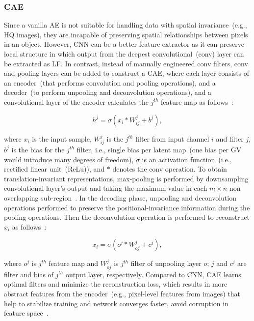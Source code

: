 \subsubsection{CAE}
Since a vanilla AE is not suitable for handling data with spatial invariance~(e.g., HQ images), they are incapable of preserving spatial relationships between pixels in an object. However, CNN can be a better feature extractor as it can preserve local structure in which output from the deepest convolutional~(conv) layer can be extracted as LF. In contrast, instead of manually engineered conv filters, conv and pooling layers can be added to construct a CAE, where each layer consists of an encoder~(that performs convolution and pooling operations), and a decoder~(to perform unpooling and deconvolution operations), and a convolutional layer of the encoder calculates the $j^{th}$ feature map as follows~\cite{alirezaie2019semantic}:

\begin{equation}
    h^{j}=\sigma\left(x_{i} * W_{ij}^{j}+b^{j}\right),
\end{equation}

\hspace*{3.5mm} where $x_i$ is the input sample, $W_{ij}^{j}$ is the $j^{th}$ filter from input channel $i$ and filter $j$, $b^j$ is the bias for the $j^{th}$ filter, i.e., single bias per latent map~(one bias per GV would introduce many degrees of freedom), $\sigma$ is an activation function~(i.e., rectified linear unit~(ReLu)), and $*$ denotes the conv operation. To obtain translation-invariant representations, max-pooling is performed by downsampling convolutional layer's output and taking the maximum value in each $m \times n$ non-overlapping sub-region~\cite{alirezaie2019semantic}. In the decoding phase, unpooling and deconvolution operations performed to preserve the positional-invariance information during the pooling operations. Then the deconvolution operation is performed to reconstruct $x_i$ as follows~\cite{alirezaie2019semantic}:

\begin{equation}
   x_i = \sigma\left(o^{j} * W_{oj}^{j}+c^{j}\right),
\end{equation}

\hspace*{3.5mm} where $o^j$ is $j^{th}$ feature map and $W_{oj}^{j}$ is $j^{th}$ filter of unpooling layer $o$; $j$ and $c^j$ are filter and bias of $j^{th}$ output layer, respectively. Compared to CNN, CAE learns optimal filters and minimize the reconstruction loss, which results in more abstract features from the encoder~(e.g., pixel-level features from images) that help to stabilize training and network converges faster, avoid corruption in feature space~\cite{guo2017deep}. 

